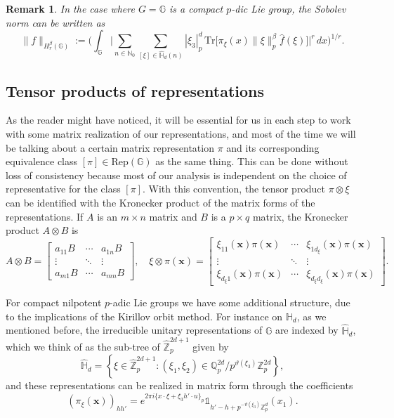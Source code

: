\documentclass[12pt, reqno]{amsart}
\newtheorem{rem}[defi]{Remark}
\newcommand{\1}{\mathds{1}}
\newcommand{\G}{\mathbb{G}}
\begin{document}
\begin{rem}
In the case where $G = \mathbb{G}$ is a compact $p$-dic Lie group, the Sobolev norm can be written as
\[
\| f \|_{H_r^\beta(\mathbb{G})} := \Bigg( \int_{\mathbb{G}} \Big| \sum_{n \in \mathbb{N}_0} \sum_{[\xi] \in \widehat{\mathbb{H}}_d(n)} |\xi_3|_p^d \, \mathrm{Tr}\big[ \pi_\xi(x) \| \xi \|_p^\beta \widehat{f}(\xi) \big] \Big|^r \, dx \Bigg)^{1/r}.
\]
\end{rem}

\subsection{Tensor products of representations}
As the reader might have noticed, it will be essential for us in each step to work with some matrix realization of our representations, and most of the time we will be talking about a certain matrix representation $\pi$ and its corresponding equivalence class $[\pi] \in \mathrm{Rep}(\G)$ as the same thing. This can be done without loss of consistency because most of our analysis is independent on the choice of representative for the class $[\pi]$. With this convention, the tensor product $\pi \otimes \xi$ can be identified with the Kronecker product of the matrix forms of the representations. If $A$ is an $m \times n$ matrix and $B$ is a $p \times q$ matrix, the Kronecker product $A \otimes B$ is
\[
A \otimes B =
\begin{bmatrix}
a_{11} B & \cdots & a_{1n} B \\
\vdots & \ddots & \vdots \\
a_{m1} B & \cdots & a_{mn} B
\end{bmatrix}, \quad \xi \otimes \pi (\mathbf{x}) =
\begin{bmatrix}
\xi_{11} (\mathbf{x}) \pi (\mathbf{x}) & \cdots & \xi_{1d_\xi} (\mathbf{x}) \pi (\mathbf{x}) \\
\vdots & \ddots & \vdots \\
\xi_{d_\xi1} (\mathbf{x}) \pi (\mathbf{x}) & \cdots & \xi_{d_\xi d_\xi} (\mathbf{x}) \pi (\mathbf{x})
\end{bmatrix}.
\]

For compact nilpotent $p$-adic Lie groups we have some additional structure, due to the implications of the Kirillov orbit method. For instance on $\mathbb{H}_d$, as we mentioned before, the irreducible unitary representations of $\mathbb{G}$ are indexed by $\widehat{\mathbb{H}}_d$, which we think of as the sub-tree of $\widehat{\mathbb{Z}}_p^{2d+1}$ given by
\[
\widehat{\mathbb{H}}_d = \left\{ \xi \in \widehat{\mathbb{Z}}_p^{2d+1} : (\xi_1, \xi_2) \in \mathbb{Q}_p^{2d} / p^{\vartheta(\xi_3)} \mathbb{Z}_p^{2d} \right\},
\]
and these representations can be realized in matrix form through the coefficients
\[
(\pi_\xi(\mathbf{x}))_{hh'} = e^{2\pi i \{x \cdot \xi + \xi_3 h' \cdot u\}_p} \mathbb{1}_{h'-h + p^{-\vartheta(\xi_3)}\mathbb{Z}_p^d}(x_1).
\]
\end{document}
